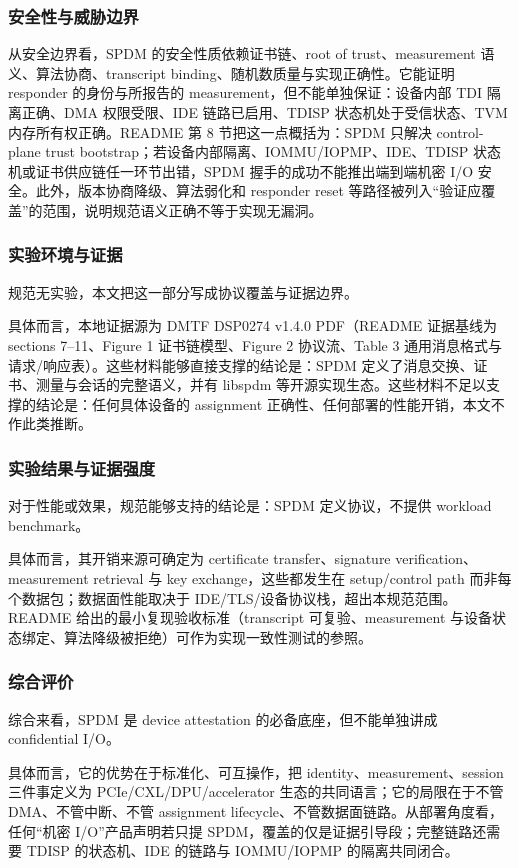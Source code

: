 \documentclass[11pt]{ctexart}
\begin{document}
\subsubsection{安全性与威胁边界}
从安全边界看，SPDM 的安全性质依赖证书链、root of trust、measurement 语义、算法协商、transcript binding、随机数质量与实现正确性。它能证明 responder 的身份与所报告的 measurement，但不能单独保证：设备内部 TDI 隔离正确、DMA 权限受限、IDE 链路已启用、TDISP 状态机处于受信状态、TVM 内存所有权正确。README 第 8 节把这一点概括为：SPDM 只解决 control-plane trust bootstrap；若设备内部隔离、IOMMU/IOPMP、IDE、TDISP 状态机或证书供应链任一环节出错，SPDM 握手的成功不能推出端到端机密 I/O 安全。此外，版本协商降级、算法弱化和 responder reset 等路径被列入“验证应覆盖”的范围，说明规范语义正确不等于实现无漏洞。\par
\subsubsection{实验环境与证据}
规范无实验，本文把这一部分写成协议覆盖与证据边界。\par
具体而言，本地证据源为 DMTF DSP0274 v1.4.0 PDF（README 证据基线为 sections 7--11、Figure 1 证书链模型、Figure 2 协议流、Table 3 通用消息格式与请求/响应表）。这些材料能够直接支撑的结论是：SPDM 定义了消息交换、证书、测量与会话的完整语义，并有 libspdm 等开源实现生态。这些材料不足以支撑的结论是：任何具体设备的 assignment 正确性、任何部署的性能开销，本文不作此类推断。\par
\subsubsection{实验结果与证据强度}
对于性能或效果，规范能够支持的结论是：SPDM 定义协议，不提供 workload benchmark。\par
具体而言，其开销来源可确定为 certificate transfer、signature verification、measurement retrieval 与 key exchange，这些都发生在 setup/control path 而非每个数据包；数据面性能取决于 IDE/TLS/设备协议栈，超出本规范范围。README 给出的最小复现验收标准（transcript 可复验、measurement 与设备状态绑定、算法降级被拒绝）可作为实现一致性测试的参照。\par
\subsubsection{综合评价}
综合来看，SPDM 是 device attestation 的必备底座，但不能单独讲成 confidential I/O。\par
具体而言，它的优势在于标准化、可互操作，把 identity、measurement、session 三件事定义为 PCIe/CXL/DPU/accelerator 生态的共同语言；它的局限在于不管 DMA、不管中断、不管 assignment lifecycle、不管数据面链路。从部署角度看，任何“机密 I/O”产品声明若只提 SPDM，覆盖的仅是证据引导段；完整链路还需要 TDISP 的状态机、IDE 的链路与 IOMMU/IOPMP 的隔离共同闭合。\par
\end{document}
